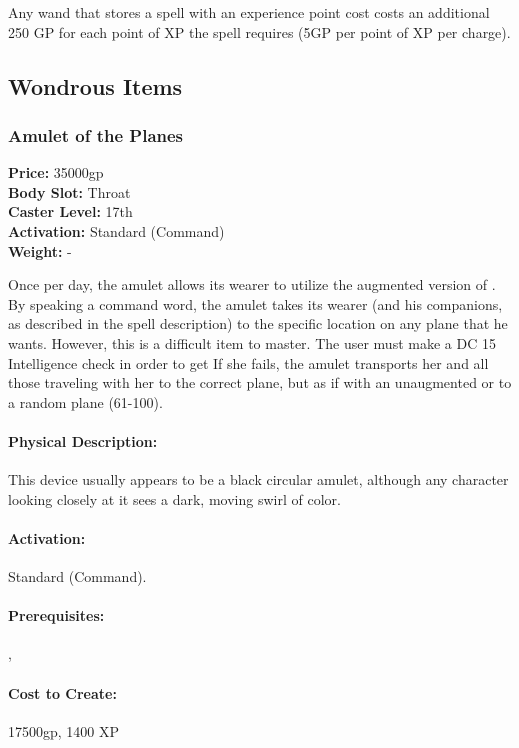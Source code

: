 Any wand that stores a spell with an experience point cost costs an additional 250 GP for each point of XP the spell requires (5GP per point of XP per charge).
\subsection{Wondrous Items}
\subsubsection{Amulet of the Planes}
   \textbf{Price:} 35000gp
\\ \textbf{Body Slot:} Throat
\\ \textbf{Caster Level:} 17th
\\ \textbf{Activation:} Standard (Command)
\\ \textbf{Weight:} -

Once per day, the amulet allows its wearer to utilize the augmented version of .
By speaking a command word, the amulet takes its wearer (and his companions, as described in the  spell description) to the specific location on any plane that he wants. 
However, this is a difficult item to master. The user must make a DC 15 Intelligence check in order to get 
If she fails, the amulet transports her and all those traveling with her to the correct plane, but as if with an unaugmented  or to a random plane (61-100).

\paragraph{Physical Description:} This device usually appears to be a black circular amulet, although any character looking closely at it sees a dark, moving swirl of color.

\paragraph{Activation:} Standard (Command).

\paragraph{Prerequisites:} , 

\paragraph{Cost to Create:} 17500gp, 1400 XP
